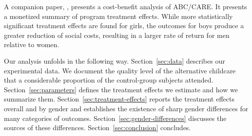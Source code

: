 A companion paper, \citet{Garcia_Heckman_Leaf_etal_2017_Comp_CBA_Unpublished}, presents a cost-benefit analysis of ABC/CARE. It presents a monetized summary of program treatment effects. While more statistically significant treatment effects are found for girls, the outcomes for boys produce a greater reduction of social costs, resulting in a larger rate of return for men relative to women.

Our analysis unfolds in the following way. Section~\ref{sec:data} describes our experimental data. We document the quality level of the alternative childcare that a considerable proportion of the control-group subjects attended. Section~\ref{sec:parameters} defines the treatment effects we estimate and how we summarize them. Section~\ref{sec:treatment-effects} reports the treatment effects overall and by gender and establishes the existence of sharp gender differences for many categories of outcomes. Section~\ref{sec:gender-differences} discusses the sources of these differences. Section~\ref{sec:conclusion} concludes.
